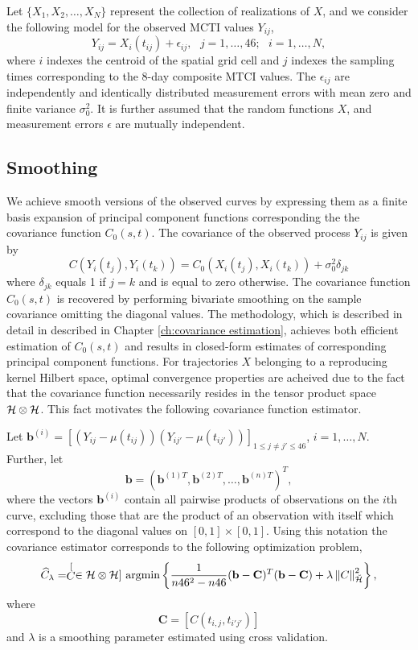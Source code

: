 Let $\{X_{1},X_{2},\dots,X_{N}\}$ represent the collection of realizations of $X$, and we consider the following model for the observed MCTI values $Y_{ij}$,
\[ Y_{ij}=X_{i}(t_{ij})+\epsilon_{ij},\mbox{ }j=1,\dots,46;\mbox{ }i=1,\dots,N, \]
where $i$ indexes the centroid of the spatial grid cell and $j$ indexes the sampling times corresponding to the 8-day composite MTCI values. The $\epsilon_{ij}$ are independently and identically distributed measurement errors with mean zero and finite variance $\sigma_{0}^{2}.$ It is further assumed that the random functions $X$, and measurement errors $\epsilon$ are mutually independent. 

\subsection{Smoothing} 

\label{sub:smoothing}
We achieve smooth versions of the observed curves by expressing them as a finite basis expansion of principal component functions corresponding the the covariance function $C_0(s,t)$. The covariance of the observed process $Y_{ij}$ is given by
\begin{equation}
	C(Y_i(t_j), Y_i(t_k)) = C_0(X_i(t_j), X_i(t_k)) + \sigma^2_0 \delta_{jk}
\end{equation}
where $\delta_{jk}$ equals 1 if $j=k$ and is equal to zero otherwise. The covariance function $C_0(s,t)$ is recovered by performing bivariate smoothing on the sample covariance omitting the diagonal values. The methodology, which is described in detail in described in Chapter \ref{ch:covariance estimation}, achieves both efficient estimation of $C_0(s,t)$ and results in closed-form estimates of corresponding principal component functions. For trajectories $X$ belonging to a reproducing kernel Hilbert space, optimal convergence properties are acheived due to the fact that the covariance function necessarily resides in the tensor product space $\mathcal{H}\otimes\mathcal{H}$. This fact motivates the following covariance function estimator.

Let $\mathbf{b}^{(i)} = [(Y_{ij}-\mu(t_{ij}))(Y_{ij'}-\mu(t_{ij'}))]_{1\leq j\neq j'\leq 46}$, $i=1, \dots, N$. Further, let
\[ \mathbf{b} = (\mathbf{b}^{(1)T}, \mathbf{b}^{(2)T}, \dots, \mathbf{b}^{(n)T} )^T, \]
where the vectors $\mathbf{b}^{(i)}$ contain all pairwise products of observations on the $i$th curve, excluding those that are the product of an observation with itself which correspond to the diagonal values on $[0,1]\times [0,1]$. Using this notation the covariance estimator corresponds to the following optimization problem,
\begin{equation}
	 \widehat{C}_{\lambda}=\stackrel[C \in \mathcal{H}\otimes \mathcal{H}]{}{\text{ argmin}} \left\{\frac{1}{n46^2-n46} (\mathbf{b} - \mathbf{C})^T(\mathbf{b} - \mathbf{C})+\lambda\left\Vert C\right\Vert _{\breve{\mathcal{H}}}^{2} \right\},
	 \label{pheno: cov est}
	 \end{equation}
where
\[ \mathbf{C} = [C(t_{i,j}, t_{i'j'})] \]
and $\lambda$ is a smoothing parameter estimated using cross validation.


